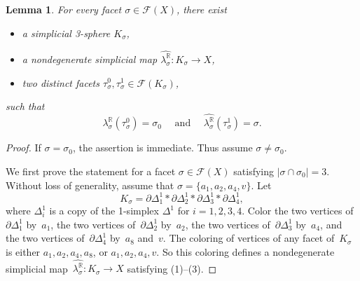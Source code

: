 \documentclass{amsart}
\newcommand{\R}{\mathbb{R}}
\newcommand{\cF}{\mathcal{F}}
\newtheorem{lemma}[theorem]{Lemma}
\theoremstyle{definition}
\theoremstyle{remark}
\begin{document}
\begin{lemma} \label{lem:any_pair_appear}
    For every facet $\sigma\in \cF(X)$, there exist 
    \begin{itemize} 
        \item[(1)] a simplicial 3-sphere $K_\sigma$,
        \item[(2)] a nondegenerate simplicial map $\widehat{{\lambda}_\sigma^\R}: K_\sigma\to X$,
        \item[(3)] two distinct facets $\tau^0_\sigma, \tau^1_\sigma\in \cF(K_\sigma)$,
    \end{itemize} 
    such that 
    $$  
        \widehat{{\lambda}_\sigma^\R}(\tau_\sigma^0)=\sigma_0 \quad \text{ and } \quad  \widehat{{\lambda}_\sigma^\R}(\tau_\sigma^1)=\sigma.
    $$  
\end{lemma}
\begin{proof}
    If $\sigma=\sigma_0$, the assertion is immediate. 
    Thus assume $\sigma\ne\sigma_0$.    
    
    We first prove the statement for a facet $\sigma\in \cF(X)$ satisfying $|\sigma\cap \sigma_0| = 3$. 
    Without loss of generality, assume that $\sigma = \{a_1, a_2, a_4, v\}$. 
    Let 
    $$
        K_\sigma = \partial\Delta_1^1 \ast \partial\Delta_2^1 \ast \partial\Delta_3^1 \ast \partial\Delta_4^1,
    $$ where $\Delta_i^1$ is a copy of the 1-simplex $\Delta^1$ for $i = 1, 2, 3, 4$. 
    Color the two vertices of~$\partial \Delta_1^1$ by~$a_1$, the two vertices of~$\partial \Delta_2^1$ by~$a_2$, the two vertices of~$\partial\Delta_3^1$ by~$a_4$, and the two vertices of~$\partial \Delta_4^1$ by~$a_8$ and~$v$.
    The coloring of vertices of any facet of~$K_\sigma$ is either $a_1, a_2, a_4, a_8$, or $a_1, a_2, a_4, v$. 
    So this coloring defines a nondegenerate simplicial map~$\widehat{{\lambda}_\sigma^\R} \colon K_\sigma\to X$ satisfying (1)--(3).
    

\end{proof}
\end{document}
